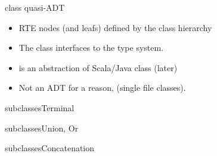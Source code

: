 \begin{frame}{ class quasi-ADT}
  \scalebox{0.9}{}

  \medskip

  \begin{itemize}
  \item RTE nodes (and leafs) defined by the class hierarchy 
  \item The  class interfaces to the type system.
  \item {} is an abstraction of Scala/Java class (later)
  \item Not an ADT for a  reason, (single file   classes).
  \end{itemize}
\end{frame}

\newsavebox\leafbox
\begin{lrbox}{\leafbox}
  \begin{minipage}{12cm}
    
  \end{minipage}
\end{lrbox}

\begin{frame}{ subclasses}{Terminal}
  \usebox\leafbox
\end{frame}

\newsavebox\orbox
\begin{lrbox}{\orbox}
  \begin{minipage}{12cm}
    
  \end{minipage}
\end{lrbox}

\newsavebox\andbox
\begin{lrbox}{\andbox}
  \begin{minipage}{12cm}
    
  \end{minipage}
\end{lrbox}


\begin{frame}{ subclasses}{Union, Or}
  \usebox\orbox
 \end{frame}




\newsavebox\catbox
\begin{lrbox}{\catbox}
  \begin{minipage}{12cm}
    
  \end{minipage}
\end{lrbox}


\begin{frame}{ subclasses}{Concatenation}
  \usebox\catbox
 \end{frame}



